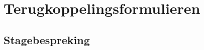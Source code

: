 \documentclass[a4paper]{article}
\begin{document}
  \section{Terugkoppelingsformulieren}
    \subsection{Stagebespreking}
\end{document}
